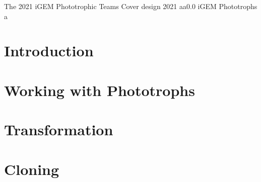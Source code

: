 \documentclass{tstextbook}
\begin{document}
       {The 2021 iGEM Phototrophic Teams}
       {Cover design}
       {2021}
       {a}{a}{0.0}
       {iGEM Phototrophs}
       {a}

\chapter{Introduction}









\chapter{Working with Phototrophs}








\chapter{Transformation}




\chapter{Cloning}



\end{document}

